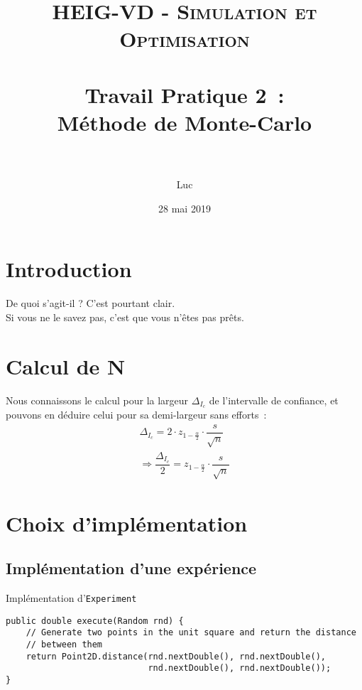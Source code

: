 \documentclass[paper=a4, fontsize=13pt]{scrartcl}
\title{
  \normalfont \normalsize
  \textsc{HEIG-VD - Simulation et Optimisation} \\[10pt]
  \horrule{1pt} \\[0.4cm] %
  \huge Travail Pratique 2~:\\Méthode de Monte-Carlo \\
  \horrule{2pt} \\[0.4cm] %
}
\author{Luc \bsc{Wachter}}
\date{28 mai 2019}
\begin{document}
\lstset{language=Java}

\maketitle

\section{Introduction}
De quoi s'agit-il ? C'est pourtant clair.
\\
Si vous ne le savez pas, c'est que vous n'êtes pas prêts.

\newpage

\section{Calcul de N}
Nous connaissons le calcul pour la largeur \(\Delta_{I_c}\) de l'intervalle de confiance, et pouvons en déduire celui pour sa demi-largeur sans efforts~:
\begin{align*}
  \Delta_{I_c} = 2\cdot z_{1-\frac{\alpha}{2}}\cdot \dfrac{s}{\sqrt{n}} \\
  \Rightarrow \dfrac{\Delta_{I_c}}{2} = z_{1-\frac{\alpha}{2}}\cdot \dfrac{s}{\sqrt{n}}
\end{align*}

\section{Choix d'implémentation}

\subsection{Implémentation d'une expérience}
Implémentation d'\texttt{Experiment}

\begin{lstlisting}[frame=single]
public double execute(Random rnd) {
    // Generate two points in the unit square and return the distance
    // between them
    return Point2D.distance(rnd.nextDouble(), rnd.nextDouble(),
                            rnd.nextDouble(), rnd.nextDouble());
}
\end{lstlisting}
\end{document}
